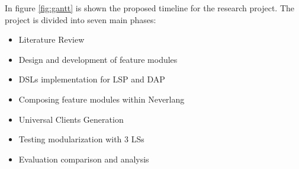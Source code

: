 In figure \ref{fig:gantt} is shown the proposed timeline for the research project. The project is divided into seven main phases:
\begin{itemize}
    \item Literature Review
    \item Design and development of feature modules
    \item DSLs implementation for LSP and DAP
    \item Composing feature modules within Neverlang
    \item Universal Clients Generation
    \item Testing modularization with 3 LSs
    \item Evaluation comparison and analysis
\end{itemize}

